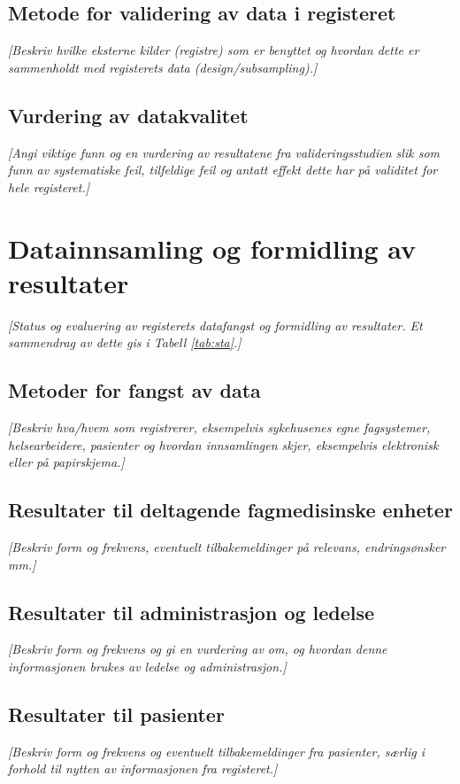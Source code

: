 \documentclass[norsk, a4paper, twocolumn]{report}
\newcommand{\guide}[1] {
	\textit{[\textcolor{guidegray}{#1}]}
	}
\begin{document}
\section{Metode for validering av data i registeret}\label{sec:metval}
\guide{Beskriv hvilke eksterne kilder (registre) som er benyttet og hvordan
dette er sammenholdt med registerets data (design/subsampling).} 

\section{Vurdering av datakvalitet}\label{sec:valdat}
\guide{Angi viktige funn og en vurdering av resultatene fra
valideringsstudien slik som funn av systematiske feil, tilfeldige feil og
antatt effekt dette har på validitet for hele registeret.}



\chapter{Datainnsamling og formidling av resultater}\label{cha:dat}
\guide{Status og evaluering av registerets  datafangst og formidling av 
resultater. Et sammendrag av dette gis i Tabell \ref{tab:sta}.}

\section{Metoder for fangst av data}\label{sec:metfan}
\guide{Beskriv hva/hvem som registrerer, eksempelvis sykehusenes egne
fagsystemer, helsearbeidere, pasienter og hvordan innsamlingen skjer,
eksempelvis elektronisk eller på papirskjema.}

\section{Resultater til deltagende fagmedisinske enheter}\label{sec:resfag}
\guide{Beskriv form og frekvens,  eventuelt tilbakemeldinger på relevans,
endringsønsker mm.}

\section{Resultater til administrasjon og ledelse}\label{sec:resled}
\guide{Beskriv form og frekvens og gi en vurdering av om, og hvordan denne
informasjonen brukes av ledelse og administrasjon.}

\section{Resultater til pasienter}\label{sec:respas}
\guide{Beskriv form og frekvens og eventuelt tilbakemeldinger fra pasienter,
særlig i forhold til nytten av informasjonen fra registeret.}
\end{document}
